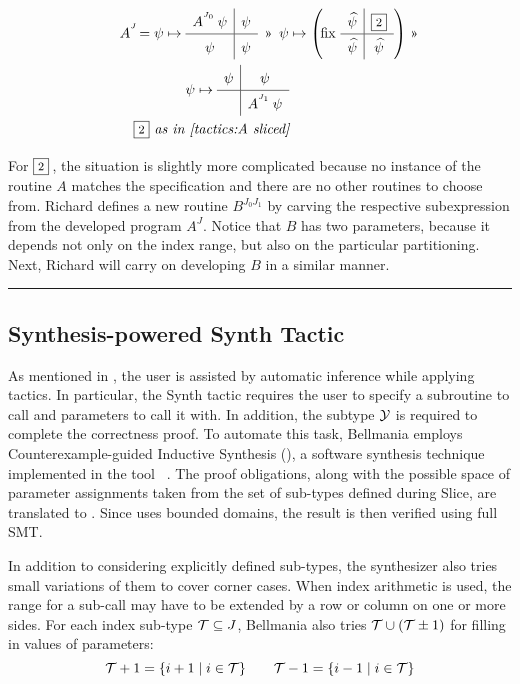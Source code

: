 \begin{equation}
  \renewcommand\arraystretch{1.5}
  \begin{array}{@{} r @{} l @{}}
    A^{^J}\! = \psi\mapsto{} & \quadrants{A^{^{J_0}}\,\psi}{\psi}{\psi}{\psi} ~ \applt 
       ~\psi \mapsto \left(\!\fix\, \quadrants{\lifted\psi}{\qbox2}{\lifted\psi}{\lifted\psi}\right) \applt \\[5mm]
       & \psi \mapsto \quadrants{\psi}{\psi}{}{A^{^{J_1}}\,\psi} \\
    \lspan2{
     \quad
     \qbox2 \textit{ as in \Cref{tactics:A sliced}}
    }
  \end{array}
  \hspace{-5mm}
  \label{tactics:A synthed}
\end{equation}

For $\qbox2$\,, the situation is slightly more complicated because no instance of the routine
$A$ matches the specification and there are no other routines to choose from.
Richard defines a new routine $B^{J_0J_1}$ by carving the respective
subexpression from the developed program $A^J$.
Notice that $B$ has two parameters, because it depends not only on the index
range, but also on the particular partitioning.
Next, Richard will carry on developing $B$ in a similar manner.

\medskip
\hrule
\medskip

\subsection{Synthesis-powered {\sf Synth} Tactic}
\label{tactics:synthesis}

As mentioned in , the user is assisted by automatic
inference while applying tactics. In particular, the {\sf Synth} tactic requires
the user to specify a subroutine to call and parameters to call it with.
In addition, the subtype $\mathcal{Y}$ is required to complete the correctness proof.
To automate this task, Bellmania employs Counterexample-guided Inductive Synthesis ({\cegis}), a software synthesis technique
implemented in the tool {\Sketch}~\cite{STTT13/Solar-Lezama}. The proof obligations, along with the possible
space of parameter assignments taken from the set of sub-types defined during
{\sf Slice}, are translated to {\Sketch}. Since {\Sketch} uses bounded domains,
the result is then verified using full SMT.

In addition to considering explicitly defined sub-types, the synthesizer also tries
small variations of them to cover corner cases. When index arithmetic is used,
the range for a sub-call may have to be extended by a row or column on one or more sides.
For each index sub-type $\mathcal{T}\subseteq J$, Bellmania also tries $\mathcal{T}\cup(\mathcal{T}\pm 1)$ for filling in values of parameters:
\[\mathcal{T}+1=\{i+1\;|\;i\in \mathcal{T}\} \qquad \mathcal{T}-1=\{i-1\;|\;i\in \mathcal{T}\}\]

